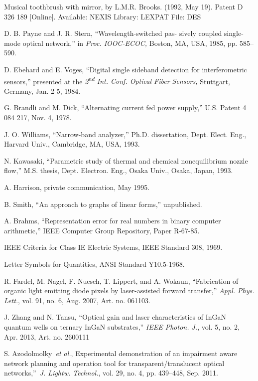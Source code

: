\documentclass[journal,twoside,web]{ieeecolor}
\begin{document}
\begin{thebibliography}{00}
 Musical toothbrush with mirror, by L.M.R. Brooks. (1992, May 19). Patent D 326 189 [Online]. Available: NEXIS Library: LEXPAT File: DES

 D. B. Payne and J. R. Stern, ``Wavelength-switched pas- sively coupled single-mode optical network,'' in \emph{Proc. IOOC-ECOC,} Boston, MA, USA, 1985, pp. 585--590.

 D. Ebehard and E. Voges, ``Digital single sideband detection for interferometric sensors,'' presented at the \emph{2\textsuperscript{nd} Int. Conf. Optical Fiber Sensors,} Stuttgart, Germany, Jan. 2-5, 1984.

 G. Brandli and M. Dick, ``Alternating current fed power supply,'' U.S. Patent 4 084 217, Nov. 4, 1978.

 J. O. Williams, ``Narrow-band analyzer,'' Ph.D. dissertation, Dept. Elect. Eng., Harvard Univ., Cambridge, MA, USA, 1993.

 N. Kawasaki, ``Parametric study of thermal and chemical nonequilibrium nozzle flow,'' M.S. thesis, Dept. Electron. Eng., Osaka Univ., Osaka, Japan, 1993.

 A. Harrison, private communication, May 1995.

 B. Smith, ``An approach to graphs of linear forms,'' unpublished.

 A. Brahms, ``Representation error for real numbers in binary computer arithmetic,'' IEEE Computer Group Repository, Paper R-67-85.

 IEEE Criteria for Class IE Electric Systems, IEEE Standard 308, 1969.

 Letter Symbols for Quantities, ANSI Standard Y10.5-1968.

 R. Fardel, M. Nagel, F. Nuesch, T. Lippert, and A. Wokaun, ``Fabrication of organic light emitting diode pixels by laser-assisted forward transfer,'' \emph{Appl. Phys. Lett.}, vol. 91, no. 6, Aug. 2007, Art. no. 061103.~

 J. Zhang and N. Tansu, ``Optical gain and laser characteristics of InGaN quantum wells on ternary InGaN substrates,'' \emph{IEEE Photon. J.}, vol. 5, no. 2, Apr. 2013, Art. no. 2600111

 S. Azodolmolky~\emph{et al.}, Experimental demonstration of an impairment aware network planning and operation tool for transparent/translucent optical networks,''~\emph{J. Lightw. Technol.}, vol. 29, no. 4, pp. 439--448, Sep. 2011.

\end{thebibliography}
\end{document}
